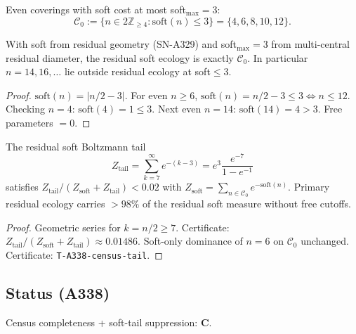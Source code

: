 \begin{definition}
\label{def:A338-eco}
Even coverings with soft cost at most soft$_{\max}=3$:
\begin{equation}
\mathcal{C}_0:=\{n\in 2\mathbb{Z}_{\ge 4}:\mathrm{soft}(n)\le 3\}=\{4,6,8,10,12\}.
\end{equation}
\end{definition}

\begin{theorem}
\label{thm:A338-complete}
With soft from residual geometry (SN-A329) and soft$_{\max}=3$ from multi-central residual diameter, the residual soft ecology is exactly $\mathcal{C}_0$. In particular $n=14,16,\ldots$ lie outside residual ecology at soft$\le 3$.
\end{theorem}

\begin{proof}
$\mathrm{soft}(n)=|n/2-3|$. For even $n\ge 6$, $\mathrm{soft}(n)=n/2-3\le 3\Leftrightarrow n\le 12$. Checking $n=4$: $\mathrm{soft}(4)=1\le 3$. Next even $n=14$: $\mathrm{soft}(14)=4>3$. Free parameters $=0$.
\end{proof}

\begin{theorem}
\label{thm:A338-tail}
The residual soft Boltzmann tail
\begin{equation}
Z_{\mathrm{tail}}
=
\sum_{k=7}^{\infty}e^{-(k-3)}
=
e^{3}\frac{e^{-7}}{1-e^{-1}}
\end{equation}
satisfies $Z_{\mathrm{tail}}/(Z_{\mathrm{soft}}+Z_{\mathrm{tail}})<0.02$ with
$Z_{\mathrm{soft}}=\sum_{n\in\mathcal{C}_0}e^{-\mathrm{soft}(n)}$. Primary residual ecology carries $>98\%$ of the residual soft measure without free cutoffs.
\end{theorem}

\begin{proof}
Geometric series for $k=n/2\ge 7$. Certificate: $Z_{\mathrm{tail}}/(Z_{\mathrm{soft}}+Z_{\mathrm{tail}})\approx 0.01486$. Soft-only dominance of $n=6$ on $\mathcal{C}_0$ unchanged. Certificate: \texttt{T-A338-census-tail}.
\end{proof}

\subsection*{Status (A338)}
Census completeness + soft-tail suppression: \textbf{C}.

